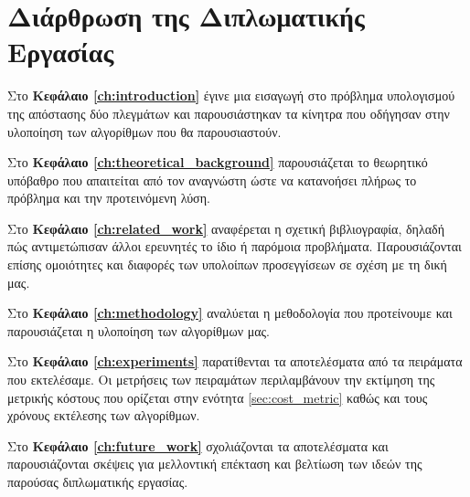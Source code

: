 \section{Διάρθρωση της Διπλωματικής Εργασίας}
Στο \textbf{Κεφάλαιο \ref{ch:introduction}} έγινε μια εισαγωγή στο 
πρόβλημα υπολογισμού της απόστασης δύο πλεγμάτων και παρουσιάστηκαν
τα κίνητρα που οδήγησαν στην υλοποίηση των αλγορίθμων που θα 
παρουσιαστούν. 

Στο \textbf{Κεφάλαιο \ref{ch:theoretical_background}} παρουσιάζεται το 
θεωρητικό υπόβαθρο που απαιτείται από τον αναγνώστη ώστε να κατανοήσει
πλήρως το πρόβλημα και την προτεινόμενη λύση.

Στο \textbf{Κεφάλαιο \ref{ch:related_work}} αναφέρεται η σχετική 
βιβλιογραφία, δηλαδή πώς αντιμετώπισαν άλλοι ερευνητές το ίδιο ή 
παρόμοια προβλήματα. 
Παρουσιάζονται επίσης ομοιότητες και διαφορές
των υπολοίπων προσεγγίσεων σε σχέση με τη δική μας.

Στο \textbf{Κεφάλαιο \ref{ch:methodology}} αναλύεται η μεθοδολογία 
που προτείνουμε και παρουσιάζεται η υλοποίηση των αλγορίθμων μας.

Στο \textbf{Κεφάλαιο \ref{ch:experiments}} παρατίθενται τα αποτελέσματα 
από τα πειράματα που εκτελέσαμε. 
Οι μετρήσεις των πειραμάτων περιλαμβάνουν την εκτίμηση της μετρικής 
κόστους που ορίζεται στην ενότητα \ref{sec:cost_metric} καθώς και τους χρόνους
εκτέλεσης των αλγορίθμων. 

Στο \textbf{Κεφάλαιο \ref{ch:future_work}} σχολιάζονται τα αποτελέσματα
και παρουσιάζονται σκέψεις για μελλοντική επέκταση και βελτίωση των 
ιδεών της παρούσας διπλωματικής εργασίας.
